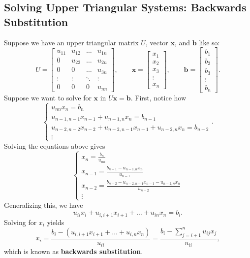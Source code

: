 \documentclass[letterpaper]{article}
\newcommand{\0}{\mathbf{0}}
\renewcommand{\b}{\mathbf{b}}
\newcommand{\x}{\mathbf{x}}
\begin{document}
\subsection{Solving Upper Triangular Systems: Backwards Substitution}
Suppose we have an upper triangular matrix $U$, vector $\x$, and $\b$ like so: 
\[U = \begin{bmatrix}
    u_{11} & u_{12} & \hdots & u_{1n}  \\ 
    0 & u_{22} & \hdots & u_{2n} \\ 
    0 & 0 & \hdots & u_{3n} \\
    \vdots & \vdots & \ddots & \vdots \\  
    0 & 0 & 0 & u_{nn}
\end{bmatrix}, \qquad \x = \begin{bmatrix}
    x_1 \\ x_2 \\ x_3 \\ \vdots \\ x_n
\end{bmatrix}, \qquad \b = \begin{bmatrix}
    b_1 \\ b_2 \\ b_3 \\ \vdots \\ b_n
\end{bmatrix}.\]
Suppose we want to solve for $\x$ in $U\x = \b$. First, notice how 
\[\begin{cases}
    u_{nn} x_n = b_n \\ 
    u_{n - 1, n - 1} x_{n - 1} + u_{n - 1, n} x_n = b_{n - 1} \\ 
    u_{n - 2, n - 2} x_{n - 2} + u_{n - 2, n - 1} x_{n - 1} + u_{n - 2, n} x_n = b_{n - 2} \\ 
    \vdots 
\end{cases}.\]
Solving the equations above gives
\[\begin{cases}
    x_n = \frac{b_n}{u_{nn}} \\ 
    x_{n - 1} = \frac{b_{n - 1} - u_{n - 1, n}x_n}{u_{n - 1}} \\ 
    x_{n - 2} = \frac{b_{n - 2} - u_{n - 2, n - 1}x_{n - 1} - u_{n - 2, n}x_n}{u_{n - 2}} \\ 
    \vdots 
\end{cases}\]
Generalizing this, we have 
\[u_{ii}x_i + u_{i, i + 1}x_{i + 1} + \hdots + u_{in}x_n = b_i.\]
Solving for $x_i$ yields
\[\boxed{x_i = \frac{b_i - \left(u_{i, i + 1}x_{i + 1} + \hdots + u_{i, n} x_n\right)}{u_{ii}} = \frac{b_i - \sum_{j = i + 1}^{n} u_{ij}x_j}{u_{ii}}},\]
which is known as \textbf{backwards substitution}.
\end{document}
